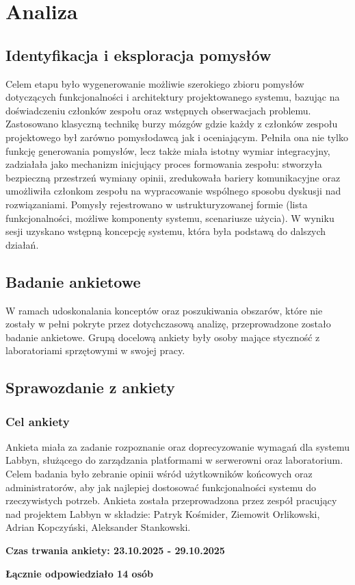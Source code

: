 \chapter{Analiza}

\section{Identyfikacja i eksploracja pomysłów}
\par Celem etapu było wygenerowanie możliwie szerokiego zbioru pomysłów dotyczących funkcjonalności i architektury projektowanego systemu, bazując na doświadczeniu członków zespołu oraz wstępnych obserwacjach problemu. Zastosowano klasyczną technikę burzy mózgów gdzie każdy z członków zespołu projektowego był zarówno pomysłodawcą jak i oceniającym. Pełniła ona nie tylko funkcję generowania pomysłów, lecz także miała istotny wymiar integracyjny, zadziałała jako mechanizm inicjujący proces formowania zespołu: stworzyła bezpieczną przestrzeń wymiany opinii, zredukowała bariery komunikacyjne oraz umożliwiła członkom zespołu na wypracowanie wspólnego sposobu dyskusji nad rozwiązaniami. Pomysły rejestrowano w ustrukturyzowanej formie (lista funkcjonalności, możliwe komponenty systemu, scenariusze użycia). W wyniku sesji uzyskano wstępną koncepcję systemu, która była podstawą do dalszych działań.

\section{Badanie ankietowe}
\par W ramach udoskonalania konceptów oraz poszukiwania obszarów, które nie zostały w pełni pokryte przez dotychczasową analizę, przeprowadzone zostało badanie ankietowe. Grupą docelową ankiety były osoby mające styczność z laboratoriami sprzętowymi w swojej pracy. 

\section{Sprawozdanie z ankiety}
\subsection{Cel ankiety}
\par Ankieta miała za zadanie rozpoznanie oraz doprecyzowanie wymagań dla systemu \gls{Labbyn}, służącego do zarządzania \gls{platforma}mi w serwerowni oraz \gls{laboratorium}. Celem badania było zebranie opinii wśród użytkowników końcowych oraz administratorów, aby jak najlepiej dostosować funkcjonalności systemu do rzeczywistych potrzeb. Ankieta została przeprowadzona przez zespół pracujący nad projektem \gls{Labbyn} w składzie: Patryk Kośmider,  Ziemowit Orlikowski,  Adrian Kopczyński,  Aleksander Stankowski.
\par \textbf{Czas trwania ankiety: 23.10.2025 - 29.10.2025}
\par \textbf{Łącznie odpowiedziało 14 osób}

